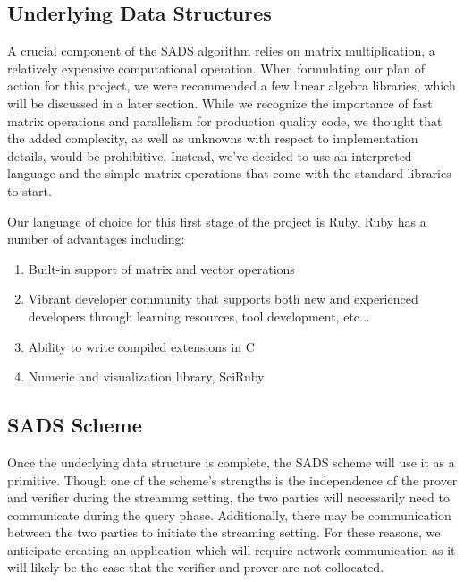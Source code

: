 \documentclass[11pt, letterpaper, oneside]{article}
\begin{document}
	\subsection{Underlying Data Structures}

	A crucial component of the SADS algorithm relies on matrix multiplication, a relatively expensive computational operation.
	When formulating our plan of action for this project, we were recommended a few linear algebra libraries, which will be discussed in a later section.
	While we recognize the importance of fast matrix operations and parallelism for production quality code, we thought that the added complexity, as well as unknowns with respect to implementation details, would be prohibitive.
	Instead, we've decided to use an interpreted language and the simple matrix operations that come with the standard libraries to start.

	Our language of choice for this first stage of the project is Ruby. Ruby has a number of advantages including:

	\begin{enumerate}
	\item Built-in support of matrix and vector operations
	\item Vibrant developer community that supports both new and experienced developers through learning resources, tool development, etc...
	\item Ability to write compiled extensions in C
	\item Numeric and visualization library, SciRuby
	\end{enumerate}

	\subsection{SADS Scheme}

	Once the underlying data structure is complete, the SADS scheme will use it as a primitive.
	Though one of the scheme's strengths is the independence of the prover and verifier during the streaming setting, the two parties will necessarily need to communicate during the query phase.
	Additionally, there may be communication between the two parties to initiate the streaming setting.
	For these reasons, we anticipate creating an application which will require network communication as it will likely be the case that the verifier and prover are not collocated.

\end{document}
